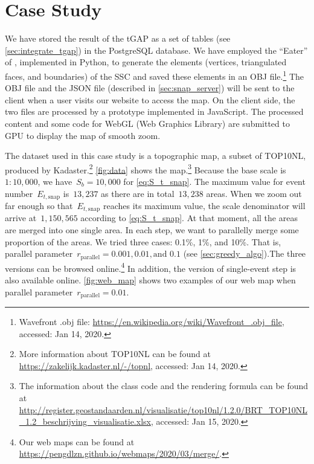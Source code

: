\documentclass[ijgi,article,submit,moreauthors,pdftex]{Definitions/mdpi}
\begin{document}
\section{Case Study}
\label{sec:case_study}

We have stored the result of the tGAP 
as a set of tables (see \sect\ref{sec:integrate_tgap}) 
in the PostgreSQL database.
We have employed the ``Eater'' of \citet{Suba2014Merge},
implemented in Python, 
to generate the elements
(vertices, triangulated faces, and boundaries)
of the SSC \citep{vanOosterom2014tGAPSSC} 
and saved these elements in an OBJ file.\footnote{%
Wavefront .obj file:
\url{https://en.wikipedia.org/wiki/Wavefront_.obj_file},
accessed: Jan 14, 2020.}
%
The OBJ file and the JSON file (described in \sect\ref{sec:snap_server}) 
will be sent to the client 
when a user visits our website to access the map.
On the client side,
the two files are processed
by a prototype implemented in JavaScript.
The processed content and some code for WebGL (Web Graphics Library)
are submitted to GPU to display the map of smooth zoom.


The dataset used in this case study is a topographic map, 
a subset of TOP10NL,
produced by Kadaster.\footnote{%
More information about TOP10NL can be found at
\url{https://zakelijk.kadaster.nl/-/topnl},
accessed: Jan 14, 2020.}
%
\figs\ref{fig:data} shows the map.\footnote{%
The information about the class code and the rendering formula can be found at
\url{http://register.geostandaarden.nl/visualisatie/top10nl/1.2.0/BRT_TOP10NL_1.2_beschrijving_visualisatie.xlsx},
accessed: Jan 15, 2020.}
%
Because the base scale is $1:10{,}000$, 
we have~$S_b = 10{,}000$ for \eq\ref{eq:S_t_snap}.
The maximum value for event number~$E_{t,\mathrm{snap}}$ is~$13{,}237$
as there are in total~$13{,}238$ areas.
When we zoom out far enough 
so that~$E_{t,\mathrm{snap}}$ reaches its maximum value,
the scale denominator will arrive at~$1{,}150{,}565$
according to \eq\ref{eq:S_t_snap}.
At that moment, all the areas are merged into one single area.
In each step, we want to parallelly merge some proportion of the areas.
We tried three cases: 0.1\%, 1\%, and 10\%.
That is, parallel parameter~$r_\mathrm{parallel}=0.001, 0.01, \text{and~} 0.1$ 
(see \sect\ref{sec:greedy_algo}).The three versions can be browsed online.\footnote{%
Our web maps can be found at
\url{https://pengdlzn.github.io/webmaps/2020/03/merge/}.} 
In addition, the version of single-event step is also available online.
\fig\ref{fig:web_map} shows two examples of our web map when 
parallel parameter~$r_\mathrm{parallel}=0.01$.
\end{document}
